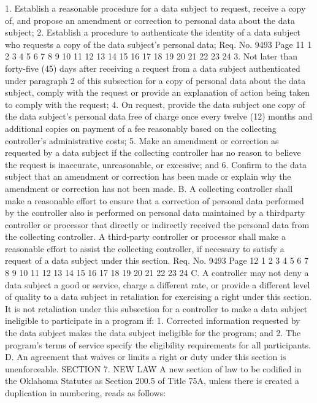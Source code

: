 1. Establish a reasonable procedure for a data subject to
request, receive a copy of, and propose an amendment or correction
to personal data about the data subject;
2. Establish a procedure to authenticate the identity of a data
subject who requests a copy of the data subject's personal data;
Req. No. 9493 Page 11
1
2
3
4
5
6
7
8
9
10
11
12
13
14
15
16
17
18
19
20
21
22
23
24
3. Not later than forty-five (45) days after receiving a
request from a data subject authenticated under paragraph 2 of this
subsection for a copy of personal data about the data subject,
comply with the request or provide an explanation of action being
taken to comply with the request;
4. On request, provide the data subject one copy of the data
subject's personal data free of charge once every twelve (12) months
and additional copies on payment of a fee reasonably based on the
collecting controller's administrative costs;
5. Make an amendment or correction as requested by a data
subject if the collecting controller has no reason to believe the
request is inaccurate, unreasonable, or excessive; and
6. Confirm to the data subject that an amendment or correction
has been made or explain why the amendment or correction has not
been made.
B. A collecting controller shall make a reasonable effort to
ensure that a correction of personal data performed by the
controller also is performed on personal data maintained by a thirdparty controller or processor that directly or indirectly received
the personal data from the collecting controller. A third-party
controller or processor shall make a reasonable effort to assist the
collecting controller, if necessary to satisfy a request of a data
subject under this section.
Req. No. 9493 Page 12
1
2
3
4
5
6
7
8
9
10
11
12
13
14
15
16
17
18
19
20
21
22
23
24
C. A controller may not deny a data subject a good or service,
charge a different rate, or provide a different level of quality to
a data subject in retaliation for exercising a right under this
section. It is not retaliation under this subsection for a
controller to make a data subject ineligible to participate in a
program if:
1. Corrected information requested by the data subject makes
the data subject ineligible for the program; and
2. The program's terms of service specify the eligibility
requirements for all participants.
D. An agreement that waives or limits a right or duty under
this section is unenforceable.
SECTION 7. NEW LAW A new section of law to be codified
in the Oklahoma Statutes as Section 200.5 of Title 75A, unless there
is created a duplication in numbering, reads as follows:
